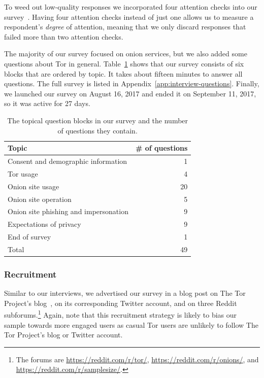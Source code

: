 To weed out low-quality responses we incorporated four attention checks into our
survey~\cite{Berinsky2014a}.  Having four attention checks instead of just one
allows us to measure a respondent's \emph{degree} of attention, meaning that we
only discard responses that failed more than two attention checks.

The majority of our survey focused on onion services, but we also added some
questions about Tor in general.  Table~\ref{tab:survey-structure} shows that our
survey consists of six blocks that are ordered by topic.  It takes about fifteen
minutes to answer all questions.  The full survey is listed in
Appendix~\ref{app:interview-questions}.  Finally, we launched our survey on
August 16, 2017 and ended it on September 11, 2017, so it was active for 27
days.

\begin{table}[t]
	\centering
	\begin{tabular}{l r}
	\toprule
	Topic & \# of questions \\
	\midrule
	Consent and demographic information & 1 \\
	Tor usage & 4 \\
	Onion site usage & 20 \\
	Onion site operation & 5 \\
	Onion site phishing and impersonation & 9 \\
	Expectations of privacy & 9 \\
	End of survey & 1 \\
	\midrule
	Total & 49 \\
	\bottomrule
	\end{tabular}
	\caption{The topical question blocks in our survey and the number of
	questions they contain.}
	\label{tab:survey-structure}
\end{table}

\subsubsection{Recruitment}

Similar to our interviews, we advertised our survey in a blog post on The Tor
Project's blog~\cite{Winter2017a}, on its corresponding Twitter account, and on
three Reddit subforums.\footnote{The forums are \url{https://reddit.com/r/tor/},
\url{https://reddit.com/r/onions/}, and \url{https://reddit.com/r/samplesize/}.}
Again, note that this recruitment strategy is likely to bias our sample towards
more engaged users as casual Tor users are unlikely to follow The Tor Project's
blog or Twitter account.

